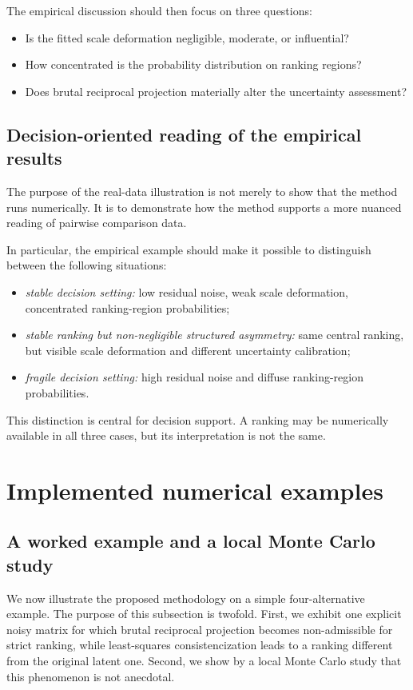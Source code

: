 \documentclass[11pt]{amsart}
\theoremstyle{definition}
\theoremstyle{plain}
\numberwithin{equation}{section}
\begin{document}
The empirical discussion should then focus on three questions:
\begin{itemize}
\item Is the fitted scale deformation negligible, moderate, or influential?
\item How concentrated is the probability distribution on ranking regions?
\item Does brutal reciprocal projection materially alter the uncertainty assessment?
\end{itemize}

\subsection{Decision-oriented reading of the empirical results}

The purpose of the real-data illustration is not merely to show that the method runs numerically. It is to demonstrate how the method supports a more nuanced reading of pairwise comparison data.

In particular, the empirical example should make it possible to distinguish between the following situations:
\begin{itemize}
\item \emph{stable decision setting:} low residual noise, weak scale deformation, concentrated ranking-region probabilities;
\item \emph{stable ranking but non-negligible structured asymmetry:} same central ranking, but visible scale deformation and different uncertainty calibration;
\item \emph{fragile decision setting:} high residual noise and diffuse ranking-region probabilities.
\end{itemize}

This distinction is central for decision support. A ranking may be numerically available in all three cases, but its interpretation is not the same.
\section{Implemented numerical examples}
\subsection{A worked example and a local Monte Carlo study}

We now illustrate the proposed methodology on a simple four-alternative example. The purpose of this subsection is twofold. First, we exhibit one explicit noisy matrix for which brutal reciprocal projection becomes non-admissible for strict ranking, while least-squares consistencization leads to a ranking different from the original latent one. Second, we show by a local Monte Carlo study that this phenomenon is not anecdotal.
\end{document}
